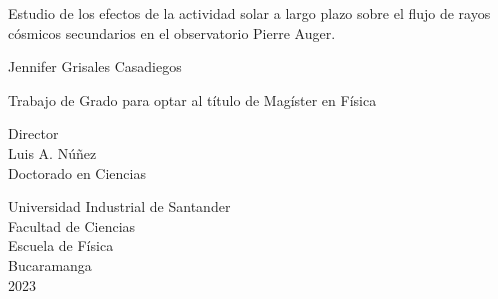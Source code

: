 
\begin{center}

Estudio de los efectos de la actividad solar a largo plazo sobre el flujo de rayos cósmicos secundarios en el observatorio Pierre Auger. \vspace{1.5cm}

Jennifer Grisales Casadiegos\\ \vspace{1.5cm}

Trabajo de Grado para optar al título de Magíster en Física\\ \vspace{0.5cm}

Director\\
Luis A. Núñez\\
Doctorado en Ciencias\\ \vspace{1cm}

Universidad Industrial de Santander\\
Facultad de Ciencias\\
Escuela de Física\\
Bucaramanga\\
2023\\

\end{center}
